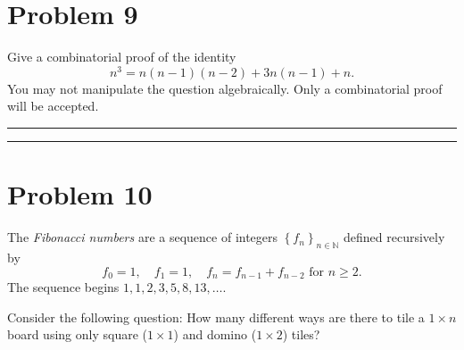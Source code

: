 \documentclass{article}
\theoremstyle{definition}
\newenvironment{solution}{\bigskip\hrule{\hfill}}{\bigskip\hrule{\hfill}} %
\begin{document}

\newpage


\section*{Problem 9}
Give a combinatorial proof of the identity $$n^3=n\left(n-1\right)\left(n-2\right)+3n\left(n-1\right)+n.$$ You may not manipulate the question algebraically. Only a combinatorial proof will be accepted.
\begin{solution}


\end{solution}


\newpage


\section*{Problem 10}
The \emph{Fibonacci numbers} are a sequence of integers $\left\{f_n\right\}_{n\in\mathbb{N}}$ defined recursively by $$f_0=1,\quad f_1=1, \quad f_n=f_{n-1}+f_{n-2}\text{ for }n\geq2.$$ The sequence begins $1,1,2,3,5,8,13,\dots$. \bigskip

\noindent Consider the following question: How many different ways are there to tile a $1\times n$ board using only square ($1\times 1$) and domino ($1\times 2$) tiles?
\begin{center}
\end{center}
\end{document}
